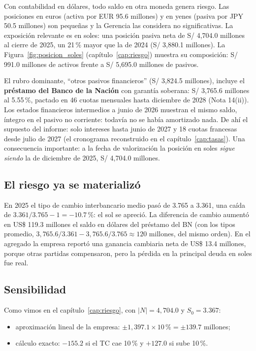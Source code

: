 Con contabilidad en dólares, todo saldo en otra moneda genera riesgo. Las posiciones en euros (activa por EUR 95.6 millones) y en yenes (pasiva por JPY 50.5 millones) son pequeñas y la Gerencia las considera no significativas. La exposición relevante es en soles: una posición pasiva neta de S/ 4,704.0 millones al cierre de 2025, un 21\,\% mayor que la de 2024 (S/ 3,880.1 millones). La Figura~\ref{fig:posicion_soles} (capítulo~\ref{cap:riesgo}) muestra su composición: S/ 991.0 millones de activos frente a S/ 5,695.0 millones de pasivos.

El rubro dominante, \enquote{otros pasivos financieros} (S/ 3,824.5 millones), incluye el \textbf{préstamo del Banco de la Nación} con garantía soberana: S/ 3,765.6 millones al 5.55\,\%, pactado en 46 cuotas mensuales hasta diciembre de 2028 (Nota 14(ii)). Los estados financieros intermedios a junio de 2026 muestran el mismo saldo, íntegro en el pasivo no corriente: todavía no se había amortizado nada. De ahí el supuesto del informe: solo intereses hasta junio de 2027 y 18 cuotas francesas desde julio de 2027 (el cronograma reconstruido en el capítulo~\ref{cap:tasas}). Una consecuencia importante: a la fecha de valorización la posición en soles \emph{sigue siendo} la de diciembre de 2025, S/ 4,704.0 millones.

\subsection{El riesgo ya se materializó}

En 2025 el tipo de cambio interbancario medio pasó de 3.765 a 3.361, una caída de $3.361/3.765-1=-10.7\,\%$: el sol se apreció. La diferencia de cambio aumentó en US\$ 119.3 millones el saldo en dólares del préstamo del BN (con los tipos promedio, $3{,}765.6/3.361-3{,}765.6/3.765\approx120$ millones, del mismo orden). En el agregado la empresa reportó una ganancia cambiaria neta de US\$ 13.4 millones, porque otras partidas compensaron, pero la pérdida en la principal deuda en soles fue real.

\subsection{Sensibilidad}

Como vimos en el capítulo~\ref{cap:riesgo}, con $|N|=4{,}704.0$ y $S_0=3.367$:
\begin{itemize}
\item aproximación lineal de la empresa: $\pm1{,}397.1\times10\,\%=\pm139.7$ millones;
\item cálculo exacto: $-155.2$ si el TC cae 10\,\% y $+127.0$ si sube 10\,\%.
\end{itemize}

